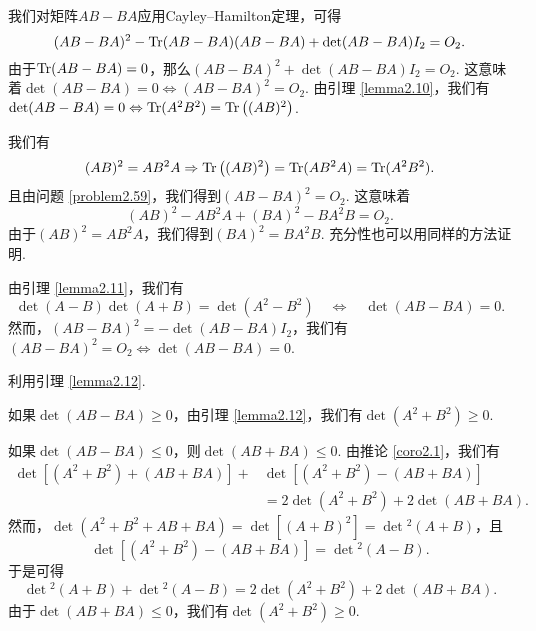 \begin{solution}
  我们对矩阵$AB-BA$应用Cayley--Hamilton定理，可得
  \[
    (AB - BA)^2 - \operatorname{Tr}(AB - BA)(AB - BA) + \det(AB - BA)I_2 = O_2.
  \]
  由于$\operatorname{Tr}(AB - BA)=0$，那么$(AB - BA)^2+\det(AB - BA)I_2=O_2$. 这意味着$\det(AB-BA)=0\Leftrightarrow(AB-BA)^2=O_2$. 由引理 \ref{lemma2.10}，我们有$\det(AB-BA)=0\Leftrightarrow\operatorname{Tr}(A^2B^2)
  =\operatorname{Tr}\big((AB)^2\big) $.
\end{solution}

\setcounter{solution}{60}

\begin{solution}
  我们有
  \[
    (AB)^2 = AB^2A \Rightarrow \operatorname{Tr}\big((AB)^2\big)
    = \operatorname{Tr}(AB^2A) = \operatorname{Tr}(A^2B^2).
  \]
  且由问题 \ref{problem2.59}，我们得到$(AB-BA)^2=O_2$. 这意味着
  \[
    (AB)^2 - AB^2A + (BA)^2 - BA^2B = O_2.
  \]
  由于$(AB)^2=AB^2A$，我们得到$(BA)^2=BA^2B$. 充分性也可以用同样的方法证明.
\end{solution}

\begin{solution}
  由引理 \ref{lemma2.11}，我们有
  \[
    \det (A - B) \det (A + B) = \det (A^2 - B^2)
    \quad \Leftrightarrow \quad
    \det (AB - BA) = 0.
  \]
  然而，$(AB-BA)^2=-\det(AB-BA)I_2$，我们有$(AB-BA)^2=O_2\Leftrightarrow\det(AB-BA)=0$.
\end{solution}

\begin{solution}
  利用引理 \ref{lemma2.12}.
\end{solution}

\begin{solution}
  如果$\det(AB-BA)\ge0$，由引理 \ref{lemma2.12}，我们有$\det(A^2+B^2)\ge0$.

  如果$\det(AB-BA)\le0$，则$\det(AB+BA)\le0$. 由推论 \ref{coro2.1}，我们有
  \begin{align*}
    \det[(A^2 + B^2) + (AB + BA)] +& \det [(A^2 + B^2) - (AB + BA)] \\
    & = 2\det(A^2 + B^2) + 2\det(AB + BA).
  \end{align*}
  然而，$\det(A^2+B^2+AB+BA)=\det[(A+B)^2]=\det{}^2(A+B)$，且
  \[
    \det [(A^2 + B^2) - (AB + BA)] = \det{}^2 (A - B).
  \]
  于是可得
  \[
    \det{}^2 (A + B) + \det{}^2(A - B) = 2\det(A^2 + B^2) + 2\det(AB + BA).
  \]
  由于$\det(AB+BA)\le0$，我们有$\det(A^2+B^2)\ge0$.
\end{solution}

